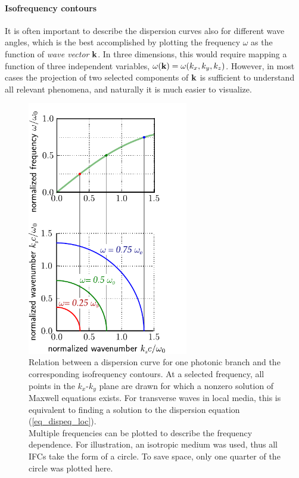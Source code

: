 \paragraph{Isofrequency contours}  %
It is often important to describe the dispersion curves also for different wave angles, which is the best accomplished by plotting the %
frequency $\omega$ as the function of \textit{wave vector} ${\mathbf{k}}$. In three dimensions, this would require mapping a function of three independent variables, $\omega({\mathbf{k}}) = \omega(k_x, k_y, k_z)$. However, in most cases the projection of two selected components of ${\mathbf{k}}$ is sufficient to understand all relevant phenomena, and naturally it is much easier to visualize. 
\begin{figure}
  \begin{minipage}[c]{0.5\textwidth}
\hfill
    \includegraphics[width=7cm]{img/dispersion_curves_to_ifc.pdf}
  \end{minipage}
  \begin{minipage}[c]{0.5\textwidth}
    \caption{Relation between a dispersion curve for one photonic branch and the corresponding isofrequency contours. At a selected frequency, all points in the $k_x$-$k_y$ plane are drawn for which a nonzero solution of Maxwell equations exists. For transverse waves in local media, this is equivalent to finding a solution to the dispersion equation (\ref{eq_dispeq_loc}).\\Multiple frequencies can be plotted to describe the frequency dependence. For illustration, an isotropic medium was used, thus all IFCs take the form of a circle. To save space, only one quarter of the circle was plotted here.} \label{fg_ifc_dc}
  \end{minipage}
\end{figure}

